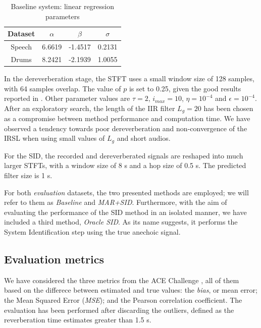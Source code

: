 \begin{table}[t]
\caption{Baseline system: linear regression parameters}
\begin{center}
\begin{tabular}{cccc}
\toprule
Dataset & $\alpha$  & $\beta$  & $\sigma$ \\
\midrule
Speech & 6.6619 & -1.4517 & 0.2131  \\
Drums  & 8.2421 & -2.1939 & 1.0055  \\
\bottomrule
\end{tabular}
\label{tab:fitting}
\end{center}
\end{table}

In the dereverberation stage, the STFT uses a small window size of 128 samples, with 64 samples overlap. The value of $p$ is set to 0.25, given the good results reported in \cite{jukic2015group}. Other parameter values are $\tau=2$, $i_{max} = 10$, $\eta=10^{-4}$ and  $\epsilon=10^{-4}$. After an exploratory search, the length of the IIR filter $L_g = 20$ has been chosen as a compromise between method performance and computation time. 
We have observed a tendency towards poor dereverberation and non-convergence of the IRSL when using small values of $L_g$ and short audios.

For the SID, the recorded and dereverberated signals are reshaped into much larger STFTs, with a window size of 8 s and a hop size of 0.5 s. The predicted filter size is 1 s. 

For both \textit{evaluation} datasets, the two presented methods are employed; we will refer to them as \textit{Baseline} and \textit{MAR+SID}. Furthermore, with the aim of evaluating the performance of the SID method in an isolated manner, we have included a third method, \textit{Oracle SID}. As its name suggests, it performs the System Identification step using the true anechoic signal.

\subsection{Evaluation metrics}
We have considered the three metrics from the ACE Challenge \cite{eaton2016estimation}, all of them based on the differece between estimated and true values: the \textit{bias}, or mean error; the Mean Squared Error (\textit{MSE}); and the Pearson correlation coefficient. The evaluation has been performed after discarding the outliers, defined as the reverberation time estimates greater than 1.5 s.


